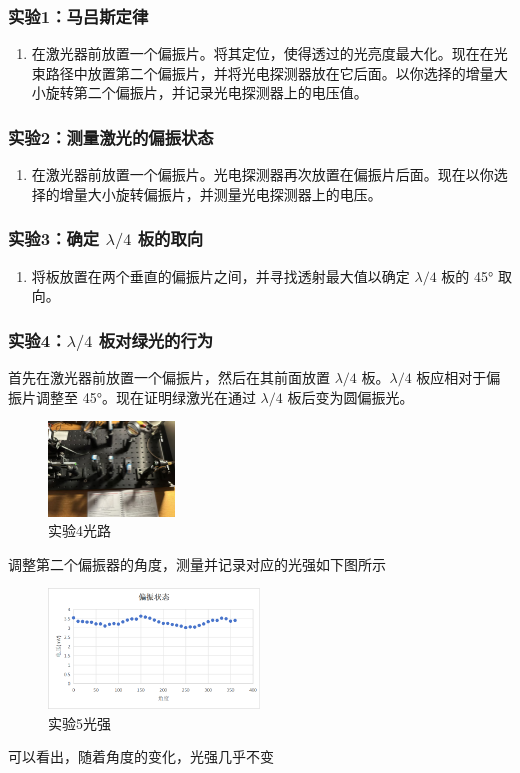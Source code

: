 \documentclass{ctexart}
\begin{document}
\subsubsection{实验1：马吕斯定律}
\begin{enumerate}
    \item 在激光器前放置一个偏振片。将其定位，使得透过的光亮度最大化。现在在光束路径中放置第二个偏振片，并将光电探测器放在它后面。以你选择的增量大小旋转第二个偏振片，并记录光电探测器上的电压值。
\end{enumerate}

\subsubsection{实验2：测量激光的偏振状态}
\begin{enumerate}
    \item 在激光器前放置一个偏振片。光电探测器再次放置在偏振片后面。现在以你选择的增量大小旋转偏振片，并测量光电探测器上的电压。
\end{enumerate}

\subsubsection{实验3：确定 $\lambda/4$ 板的取向}
\begin{enumerate}
    \item 将板放置在两个垂直的偏振片之间，并寻找透射最大值以确定 $\lambda/4$ 板的 45° 取向。
\end{enumerate}

\subsubsection{实验4：$\lambda/4$ 板对绿光的行为}
首先在激光器前放置一个偏振片，然后在其前面放置 $\lambda/4$ 板。$\lambda/4$ 板应相对于偏振片调整至 45°。现在证明绿激光在通过 $\lambda/4$ 板后变为圆偏振光。
\begin{figure}[H]
    \centering
    \includegraphics[width=0.3\textwidth]{偏振光路.jpg}
    \caption{实验4光路}
\end{figure}
调整第二个偏振器的角度，测量并记录对应的光强如下图所示
\begin{figure}[H]
    \centering
    \includegraphics[width=0.5\textwidth]{实验5.png}
    \caption{实验5光强}
\end{figure}
可以看出，随着角度的变化，光强几乎不变
\end{document}
